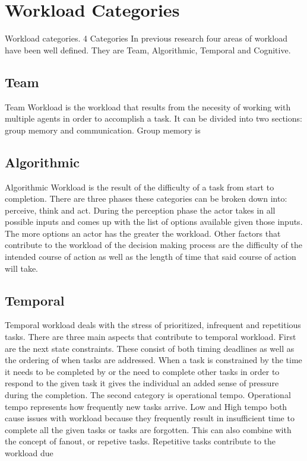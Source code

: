 \section{Workload Categories}

Workload categories.
4 Categories
	In previous research four areas of workload have been well defined. They are Team, Algorithmic, Temporal and Cognitive.
\subsection{Team}
	Team Workload is the workload that results from the necesity of working with multiple agents in order to accomplish a task. It can be divided into two sections: group memory and communication. Group memory is 

\subsection{Algorithmic}
Algorithmic Workload is the result of the difficulty of a task from start to completion. There are three phases these categories can be broken down into: perceive, think and act. During the perception phase the actor takes in all possible inputs and comes up with the list of options available given those inputs. The more options an actor has the greater the workload. Other factors that contribute to the workload of the decision making process are the difficulty of the intended course of action as well as the length of time that said course of action will take.

\subsection{Temporal}
Temporal workload deals with the stress of prioritized, infrequent and repetitious tasks. There are three main aspects that contribute to temporal workload. First are the next state constraints. These consist of both timing deadlines as well as the ordering of when tasks are addressed. When a task is constrained by the time it needs to be completed by or the need to complete other tasks in order to respond to the given task it gives the individual an added sense of pressure during the completion. The second category is operational tempo. Operational tempo represents how frequently new tasks arrive. Low and High tempo both cause issues with workload because they frequently result in insufficient time to complete all the given tasks or tasks are forgotten. This can also combine with the concept of fanout, or repetive tasks. Repetitive tasks contribute to the workload due

